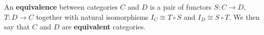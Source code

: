 An \textbf{equivalence} between categories $C$ and $D$ is a pair of functors $S: C \rightarrow D$, $T: D \rightarrow C$ together with natural isomorphisms $I_C \cong T \circ S$ and $I_D \cong S \circ T$. We then say that $C$ and $D$ are \textbf{equivalent} categories.
